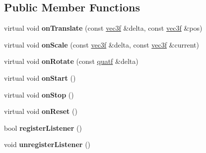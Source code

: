 \subsection*{Public Member Functions}
\begin{DoxyCompactItemize}
\item 
\hypertarget{classps_1_1scene_1_1IGizmoListener_a886e9f5f71c6800e4a5444accde10800}{}virtual void {\bfseries on\+Translate} (const \hyperlink{classps_1_1base_1_1Vec3}{vec3f} \&delta, const \hyperlink{classps_1_1base_1_1Vec3}{vec3f} \&pos)\label{classps_1_1scene_1_1IGizmoListener_a886e9f5f71c6800e4a5444accde10800}

\item 
\hypertarget{classps_1_1scene_1_1IGizmoListener_a11627a28e5e3cb1638cd1750cc9b3ea8}{}virtual void {\bfseries on\+Scale} (const \hyperlink{classps_1_1base_1_1Vec3}{vec3f} \&delta, const \hyperlink{classps_1_1base_1_1Vec3}{vec3f} \&current)\label{classps_1_1scene_1_1IGizmoListener_a11627a28e5e3cb1638cd1750cc9b3ea8}

\item 
\hypertarget{classps_1_1scene_1_1IGizmoListener_add8ff2601e9e6de1bf1aaf74ca36a51b}{}virtual void {\bfseries on\+Rotate} (const \hyperlink{classps_1_1base_1_1Quaternion}{quatf} \&delta)\label{classps_1_1scene_1_1IGizmoListener_add8ff2601e9e6de1bf1aaf74ca36a51b}

\item 
\hypertarget{classps_1_1scene_1_1IGizmoListener_ac1c3aa8fc797dea67a43286da7d4700b}{}virtual void {\bfseries on\+Start} ()\label{classps_1_1scene_1_1IGizmoListener_ac1c3aa8fc797dea67a43286da7d4700b}

\item 
\hypertarget{classps_1_1scene_1_1IGizmoListener_acd70fca1111038529305917dbfea5241}{}virtual void {\bfseries on\+Stop} ()\label{classps_1_1scene_1_1IGizmoListener_acd70fca1111038529305917dbfea5241}

\item 
\hypertarget{classps_1_1scene_1_1IGizmoListener_a81d14144400675c14bad117e91996bfb}{}virtual void {\bfseries on\+Reset} ()\label{classps_1_1scene_1_1IGizmoListener_a81d14144400675c14bad117e91996bfb}

\item 
\hypertarget{classps_1_1scene_1_1IGizmoListener_aa98fca5599db5a0c89abb3642c96671b}{}bool {\bfseries register\+Listener} ()\label{classps_1_1scene_1_1IGizmoListener_aa98fca5599db5a0c89abb3642c96671b}

\item 
\hypertarget{classps_1_1scene_1_1IGizmoListener_aca08d588bfacbac0cf3ed8c4023ef93f}{}void {\bfseries unregister\+Listener} ()\label{classps_1_1scene_1_1IGizmoListener_aca08d588bfacbac0cf3ed8c4023ef93f}

\end{DoxyCompactItemize}
